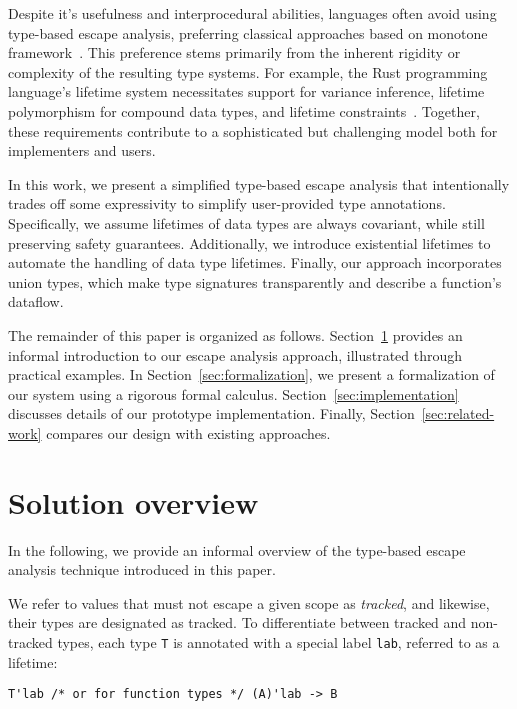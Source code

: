 \documentclass[11pt]{article}
\begin{document}
    Despite it's usefulness and interprocedural abilities, languages often avoid using type-based escape analysis, preferring classical approaches based on monotone framework~\cite{blanchet1999escape}. %
    This preference stems primarily from the inherent rigidity or complexity of the resulting type systems.
    For example, the Rust programming language’s lifetime system necessitates support for variance inference, lifetime polymorphism for compound data types, and lifetime constraints~\cite{matsakis2014rust}.
    Together, these requirements contribute to a sophisticated but challenging model both for implementers and users.

    In this work, we present a simplified type-based escape analysis that intentionally trades off some expressivity to simplify user-provided type annotations.
    Specifically, we assume lifetimes of data types are always covariant, while still preserving safety guarantees.
    Additionally, we introduce existential lifetimes to automate the handling of data type lifetimes.
    Finally, our approach incorporates union types, which make type signatures transparently and describe a function's dataflow.

    The remainder of this paper is organized as follows.
    Section~\ref{sec:overview} provides an informal introduction to our escape analysis approach, illustrated through practical examples.
    In Section~\ref{sec:formalization}, we present a formalization of our system using a rigorous formal calculus.
    Section~\ref{sec:implementation} discusses details of our prototype implementation.
    Finally, Section~\ref{sec:related-work} compares our design with existing approaches.


    \section{Solution overview} \label{sec:overview}

    In the following, we provide an informal overview of the type-based escape analysis technique introduced in this paper.

    We refer to values that must not escape a given scope as \textit{tracked}, and likewise, their types are designated as tracked.
    To differentiate between tracked and non-tracked types, each type \lstinline[language=colang]|T| is annotated with a special label \lstinline[language=colang]|lab|, referred to as a lifetime:
    \begin{lstlisting}[language=colang]
        T'lab /* or for function types */ (A)'lab -> B
    \end{lstlisting}
\end{document}
